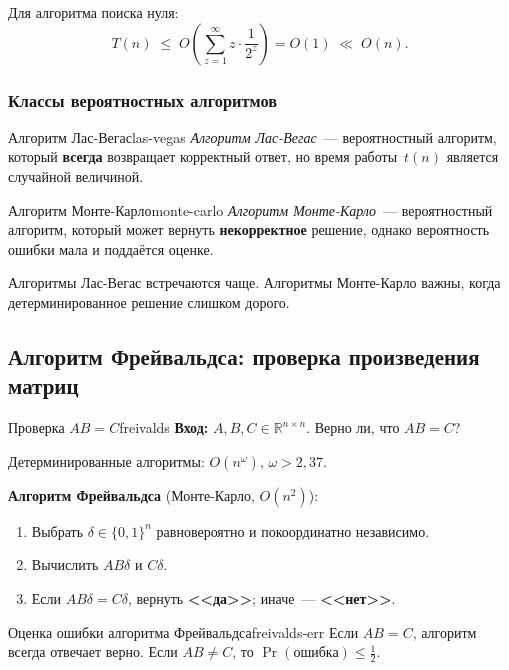 Для алгоритма поиска нуля:
\[
T(n) \;\leq\; O\!\left(\sum_{z=1}^{\infty} z\cdot\frac{1}{2^z}\right) = O(1) \;\ll\; O(n).
\]

\subsubsection*{Классы вероятностных алгоритмов}

\begin{Definition}{Алгоритм Лас-Вегас}{las-vegas}
	\emph{Алгоритм Лас-Вегас}~--- вероятностный алгоритм, который \textbf{всегда}
	возвращает корректный ответ, но время работы~$t(n)$ является случайной величиной.
\end{Definition}

\begin{Definition}{Алгоритм Монте-Карло}{monte-carlo}
	\emph{Алгоритм Монте-Карло}~--- вероятностный алгоритм, который может вернуть
	\textbf{некорректное} решение, однако вероятность ошибки мала и поддаётся оценке.
\end{Definition}

\begin{Remark}{}{}
	Алгоритмы Лас-Вегас встречаются чаще.
	Алгоритмы Монте-Карло важны, когда детерминированное решение слишком дорого.
\end{Remark}

\subsection{Алгоритм Фрейвальдса: проверка произведения матриц}

\begin{Example}{Проверка $AB = C$}{freivalds}
	\textbf{Вход:} $A, B, C \in \mathbb{R}^{n\times n}$.
	Верно ли, что $AB = C$?
	
	Детерминированные алгоритмы: $O(n^{\omega})$, $\omega > 2{,}37$.
	
	\textbf{Алгоритм Фрейвальдса} (Монте-Карло, $O(n^2)$):
	\begin{enumerate}
		\item Выбрать $\delta\in\{0,1\}^n$ равновероятно и покоординатно независимо.
		\item Вычислить $AB\delta$ и $C\delta$.
		\item Если $AB\delta = C\delta$, вернуть \textbf{<<да>>}; иначе~--- \textbf{<<нет>>}.
	\end{enumerate}
\end{Example}

\begin{Theorem}{Оценка ошибки алгоритма Фрейвальдса}{freivalds-err}
	Если $AB = C$, алгоритм всегда отвечает верно.
	Если $AB \neq C$, то $\Pr(\text{ошибка}) \leq \tfrac{1}{2}$.
\end{Theorem}

